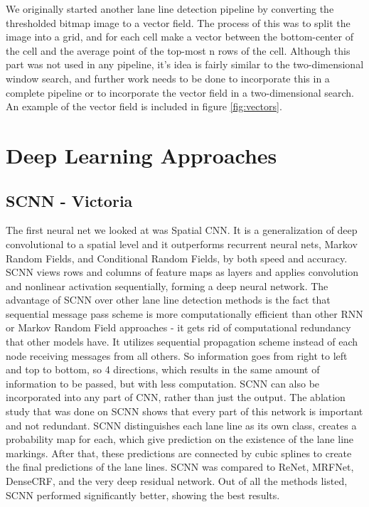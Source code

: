 \documentclass[twoside,twocolumn]{article}
\begin{document}
\par We originally started another lane line detection pipeline by converting the thresholded bitmap image to a vector field. The process of this was to split the image into a grid, and for each cell make a vector between the bottom-center of the cell and the average point of the top-most n rows of the cell. Although this part was not used in any pipeline, it's idea is fairly similar to the two-dimensional window search, and further work needs to be done to incorporate this in a complete pipeline or to incorporate the vector field in a two-dimensional search. An example of the vector field is included in figure \ref{fig:vectors}.



\section{Deep Learning Approaches}

\subsection{SCNN - Victoria}
\par The first neural net we looked at was Spatial CNN. It is a generalization of deep convolutional to a spatial level and it outperforms recurrent neural nets, Markov Random Fields, and Conditional Random Fields, by both speed and accuracy.  SCNN views rows and columns of feature maps as layers and applies convolution and nonlinear activation sequentially, forming a deep neural network. The advantage of SCNN over other lane line detection methods is the fact that sequential message pass scheme is more computationally efficient than other RNN or Markov Random Field approaches - it gets rid of computational redundancy that other models have. It utilizes sequential propagation scheme instead of each node receiving messages from all others. So information goes  from right to left and top to bottom, so 4 directions, which results in the same amount of information to be passed, but with less computation. SCNN can also be incorporated into any part of CNN, rather than just the output. The ablation study that was done on SCNN shows that every part of this network is important and not redundant. SCNN distinguishes each lane line as its own class, creates a probability map for each, which give prediction on the existence of the lane line markings. After that, these predictions are connected by cubic splines to create the final predictions of the lane lines. SCNN was compared to ReNet, MRFNet, DenseCRF, and the very deep residual network. Out of all the methods listed, SCNN performed significantly better, showing the best results.
\end{document}

